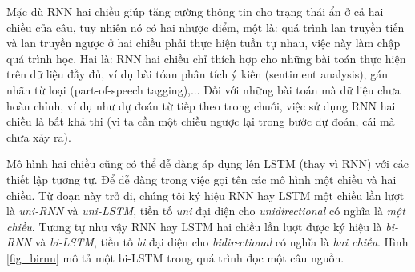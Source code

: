 Mặc dù RNN hai chiều giúp tăng cường thông tin cho trạng thái ẩn ở cả hai chiều của câu, tuy nhiên nó có hai nhược điểm, một là: quá trình lan truyền tiến và lan truyền ngược ở hai chiều phải thực hiện tuần tự nhau, việc này làm chập quá trình học. Hai là: RNN hai chiều chỉ thích hợp cho những bài toán thực hiện trên dữ liệu đầy đủ, ví dụ bài tóan phân tích ý kiến (sentiment analysis), gán nhãn từ loại (part-of-speech tagging),... Đối với những bài toán mà dữ liệu chưa hoàn chỉnh, ví dụ như dự đoán từ tiếp theo trong chuỗi, việc sử dụng RNN hai chiều là bất khả thi (vì ta cần một chiều ngược lại trong bước dự đoán, cái mà chưa xảy ra).

Mô hình hai chiều cũng có thể dễ dàng áp dụng lên LSTM (thay vì RNN) với các thiết lập tương tự. Để dễ dàng trong việc gọi tên các mô hình một chiều và hai chiều. Từ đoạn này trở đi, chúng tôi ký hiệu RNN hay LSTM một chiều lần lượt là \textit{uni-RNN} và \textit{uni-LSTM}, tiền tố \textit{uni} đại diện cho \textit{unidirectional} có nghĩa là \textit{một chiều}. Tương tự như vậy RNN hay LSTM hai chiều lần lượt được ký hiệu là \textit{bi-RNN} và \textit{bi-LSTM}, tiền tố \textit{bi} đại diện cho \textit{bidirectional} có nghĩa là \textit{hai chiều}. Hình \ref{fig_birnn} mô tả một bi-LSTM trong quá trình đọc một câu nguồn.











